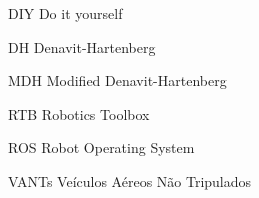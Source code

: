 \begin{KeepFromToc} %
\listoffigures
\cleardoublepage


\listoftables
\cleardoublepage


\makeatletter
\let\l@listing\l@figure
\def\newfloat@listoflisting@hook{\let\figurename\listingname}
\makeatother

\listoflistings


\begin{siglas}
	\item[DIY]       Do it yourself
    \item[DH]		 Denavit-Hartenberg
    \item[MDH]		 Modified Denavit-Hartenberg
    \item[RTB]		 Robotics Toolbox
    \item[ROS]       Robot Operating System
    \item[VANTs]     Veículos Aéreos Não Tripulados
	
\end{siglas}
\end{KeepFromToc}

\tableofcontents*
\cleardoublepage


